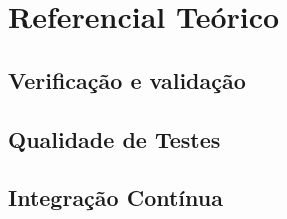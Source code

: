\chapter[Referencial]{Referencial Teórico}

\section{Verificação e validação}
\section{Qualidade de Testes}
\section{Integração Contínua}

